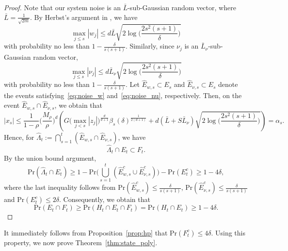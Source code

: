 \documentclass[11pt]{article}
\theoremstyle{plain}
\theoremstyle{definition}
\theoremstyle{remark}
\begin{document}
\begin{proof}
Note that our system noise is an $\bar L$-sub-Gaussian random vector, where $\bar L=\frac{1}{\sqrt{2m}}$. By Herbst's argument in \cite{ledoux1999concentration}, we have
\begin{equation}\label{eq:noise_w}
\max_{j \leq s}|w_j| \leq d \bar L\sqrt{2\log\bigg(\frac{2s^2(s+1)}{\delta}\bigg)}
\end{equation}
with probability no less than $1-\frac{\delta}{s(s+1)}$. 
Similarly, since $\nu_j$ is an $\bar L_{\nu}$-sub-Gaussian random vector, 
\begin{equation}\label{eq:noise_nu}
\max_{j \leq s}|\nu_j| \leq d \bar L_{\nu}\sqrt{2\log\bigg(\frac{2s^2(s+1)}{\delta}\bigg)}
\end{equation}
with probability no less than $1-\frac{\delta}{s(s+1)}$.
Let $\hat{E}_{w,s} \subset E_s$ and $\hat{E}_{\nu,s}\subset E_s$  denote the events satisfying~\eqref{eq:noise_w} and~\eqref{eq:noise_nu}, respectively. 
Then, on the event $\hat{E}_{w,s} \cap \hat{E}_{\nu,s}$, we obtain that
\[
|x_s|\leq \frac{1}{1-\rho}\bigg(\frac{M_{\rho}}{\rho}\bigg)^d\left(G\Big(\max_{j< s}|z_j|\Big )^{\frac{d}{d+1}}\beta_{s}(\delta)^{\frac{1}{2(d+1)}}+d (\bar L+S\bar L_{\nu})\sqrt{2\log\bigg(\frac{2s^2(s+1)}{\delta}\bigg)}\right)=\alpha_s.
\]
Hence, for $\hat{\Lambda}_t := \bigcap_{s=1}^t (\hat{E}_{w,s} \cap \hat{E}_{\nu,s})$, we have
\[
\hat{\Lambda}_t \cap E_t \subset F_t.
\]
By the union bound argument, 
\[
\mathrm{Pr} (\hat{\Lambda}_t \cap E_t) \geq 1 - \mathrm{Pr} \bigg (\bigcup_{s=1}^t (\hat{E}_{w, s}^c \cup \hat{E}_{\nu, s}^c ) \bigg ) - \mathrm{Pr} (E_t^c) \geq 1-4\delta,
\]
where the last inequality follows from 
$\mathrm{Pr} (\hat{E}_{w, s}^c )\leq \frac{\delta}{s(s+1)}$, $\mathrm{Pr} (\hat{E}_{\nu, s}^c )\leq \frac{\delta}{s(s+1)}$ and $\mathrm{Pr} (E_t^c) \leq 2\delta$. 
Consequently, we obtain that
\[
\mathrm{Pr} (E_t \cap F_t) \geq \mathrm{Pr} (H_t \cap E_t \cap F_t) = \mathrm{Pr} (H_t \cap E_t) \geq 1-4\delta.
\]
\end{proof}

It  immediately follows from Proposition~\ref{prop:hp}  that $\mathrm{Pr} (F_t^c) \leq 4\delta$. 
Using this property, we now prove Theorem~\ref{thm:state_poly}.
\end{document}
